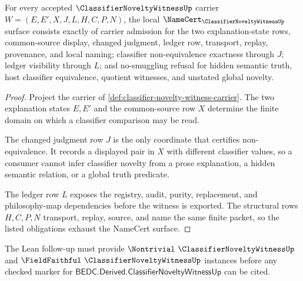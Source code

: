 \begin{theorem}
\label{thm:classifier-novelty-witness-namecert-obligations}
For every accepted $\ClassifierNoveltyWitnessUp$ carrier $W=(E,E',X,J,L,H,C,P,N)$, the local $\NameCert_{\ClassifierNoveltyWitnessUp}$ surface consists exactly of carrier admission for the two explanation-state rows, common-source display, changed judgment, ledger row, transport, replay, provenance, and local naming; classifier non-equivalence exactness through $J$; ledger visibility through $L$; and no-smuggling refusal for hidden semantic truth, host classifier equivalence, quotient witnesses, and unstated global novelty.
\end{theorem}
\begin{proof}
Project the carrier of \autoref{def:classifier-novelty-witness-carrier}. The two explanation states $E,E'$ and the common-source row $X$ determine the finite domain on which a classifier comparison may be read.

The changed judgment row $J$ is the only coordinate that certifies non-equivalence. It records a displayed pair in $X$ with different classifier values, so a consumer cannot infer classifier novelty from a prose explanation, a hidden semantic relation, or a global truth predicate.

The ledger row $L$ exposes the registry, audit, purity, replacement, and philosophy-map dependencies before the witness is exported. The structural rows $H,C,P,N$ transport, replay, source, and name the same finite packet, so the listed obligations exhaust the NameCert surface.
\end{proof}



The Lean follow-up must provide $\Nontrivial\ \ClassifierNoveltyWitnessUp$ and $\FieldFaithful\ \ClassifierNoveltyWitnessUp$ instances before any checked marker for $\mathsf{BEDC.Derived.ClassifierNoveltyWitnessUp}$ can be cited.

